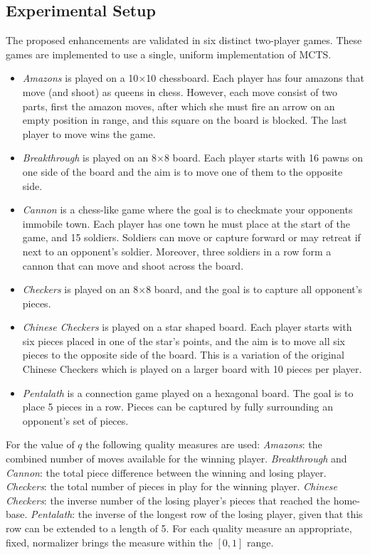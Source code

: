 \documentclass{ecai2014}
\begin{document}
\subsection{Experimental Setup}
\label{subsec:expsetup}
The proposed enhancements are validated in six distinct two-player games. These games are implemented to use a single, uniform implementation of MCTS.
\begin{itemize}
\item \emph{Amazons} is played on a 10$\times$10 chessboard. Each player has four amazons that move (and shoot) as queens in chess. However, each move consist of two parts, first the amazon moves, after which she must fire an arrow on an empty position in range, and this square on the board is blocked. The last player to move wins the game.
\item \emph{Breakthrough} is played on an 8$\times$8 board. Each player starts with 16 pawns on one side of the board and the aim is to move one of them to the opposite side.
\item \emph{Cannon} is a chess-like game where the goal is to checkmate your opponents immobile town. Each player has one town he must place at the start of the game, and 15 soldiers. Soldiers can move or capture forward or may retreat if next to an opponent's soldier. Moreover, three soldiers in a row form a cannon that can move and shoot across the board.
\item \emph{Checkers} is played on an 8$\times$8 board, and the goal is to capture all opponent's pieces.
\item \emph{Chinese Checkers} is played on a star shaped board. Each player starts with six pieces placed in one of the star's points, and the aim is to move all six pieces to the opposite side of the board. This is a variation of the original Chinese Checkers which is played on a larger board with 10 pieces per player.
\item \emph{Pentalath} is a connection game played on a hexagonal board. The goal is to place 5 pieces in a row. Pieces can be captured by fully surrounding an opponent's set of pieces.
\end{itemize}

For the value of $q$ the following quality measures are used: \emph{Amazons}: the combined number of moves available for the winning player. \emph{Breakthrough} and \emph{Cannon}: the total piece difference between the winning and losing player. \emph{Checkers}: the total number of pieces in play for the winning player. \emph{Chinese Checkers}: the inverse number of the losing player's pieces that reached the home-base. \emph{Pentalath}: the inverse of the longest row of the losing player, given that this row can be extended to a length of 5.
For each quality measure an appropriate, fixed, normalizer brings the measure within the $[0,1]$ range. 
\end{document}
